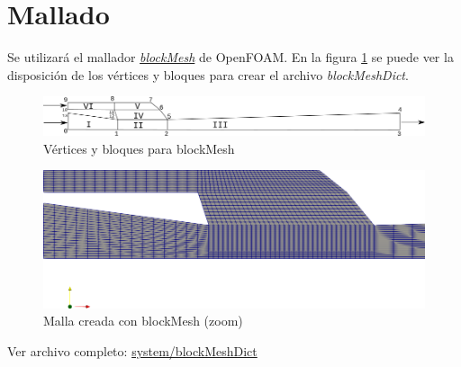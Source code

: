 \documentclass{article}
\begin{document}
\section{Mallado}
Se utilizará el mallador \textit{\href{https://cfd.direct/openfoam/user-guide/v6-blockmesh/}{blockMesh}} de OpenFOAM. En la figura \ref{fig:blockMesh} se puede ver la disposición de los vértices y bloques para crear el archivo \textit{blockMeshDict}.

\begin{landscape}
\newpage
	\begin{figure}[h!]
	\centering
	\includegraphics[width=1.5\textheight]{Figuras/01_blockMesh.png}
	\caption{Vértices y bloques para blockMesh}
	\label{fig:blockMesh}
	\end{figure}
\bigskip
	\begin{figure}[h!]
	\centering
	\includegraphics[width=1.5\textheight]{Figuras/01_mallado.png}
	\caption{Malla creada con blockMesh (zoom)}
	\label{fig:malla}
	\end{figure}
\end{landscape}
	
%
\noindent Ver archivo completo: \href{https://github.com/guillerolle/adscripcion_cfd/blob/master/01/system/blockMeshDict}{system/blockMeshDict}
\end{document}
